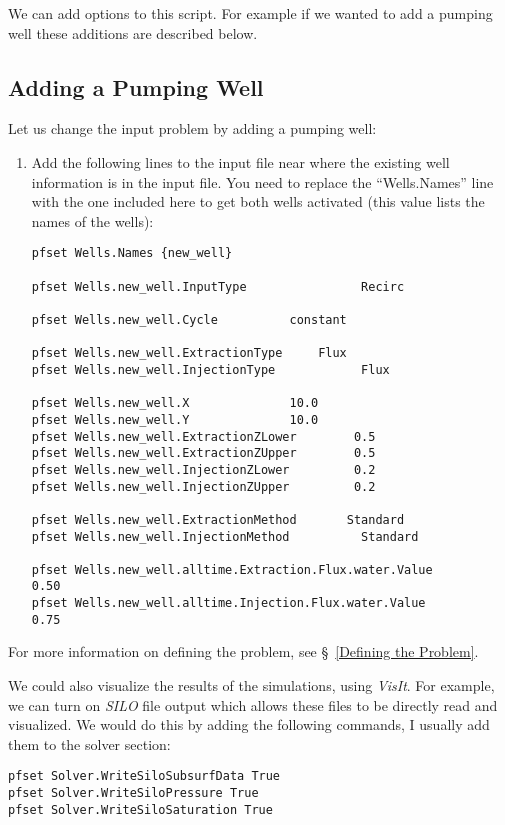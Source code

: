 We can add options to this script.  For example if we wanted to add a pumping well these additions
are described below.
\subsection*{Adding a Pumping Well}

Let us change the input problem by adding a pumping well:
\begin{enumerate}


\item 
Add the following lines to the input file near where the existing
well information is in the input file.  You need to replace
the ``Wells.Names'' line with the one included here to get both
wells activated (this value lists the names of the wells):

\begin{display}\begin{verbatim}
pfset Wells.Names {new_well}

pfset Wells.new_well.InputType                Recirc

pfset Wells.new_well.Cycle		    constant

pfset Wells.new_well.ExtractionType	    Flux
pfset Wells.new_well.InjectionType            Flux

pfset Wells.new_well.X			    10.0 
pfset Wells.new_well.Y			    10.0
pfset Wells.new_well.ExtractionZLower	     0.5
pfset Wells.new_well.ExtractionZUpper	     0.5
pfset Wells.new_well.InjectionZLower	     0.2
pfset Wells.new_well.InjectionZUpper	     0.2

pfset Wells.new_well.ExtractionMethod	    Standard
pfset Wells.new_well.InjectionMethod          Standard

pfset Wells.new_well.alltime.Extraction.Flux.water.Value        	     0.50
pfset Wells.new_well.alltime.Injection.Flux.water.Value		     0.75

\end{verbatim}\end{display}

\end{enumerate}
For more information on defining the problem,
see \S~\ref{Defining the Problem}.

We could also visualize the results of the \parflow{} simulations, using \emph{VisIt}. 
For example, we can turn on \emph{SILO} file output which allows these files to be directly
read and visualized.  We would do this by adding the following  commands, I usually 
add them to the solver section:
\begin{display}\begin{verbatim}
pfset Solver.WriteSiloSubsurfData True
pfset Solver.WriteSiloPressure True
pfset Solver.WriteSiloSaturation True
\end{verbatim}\end{display}


